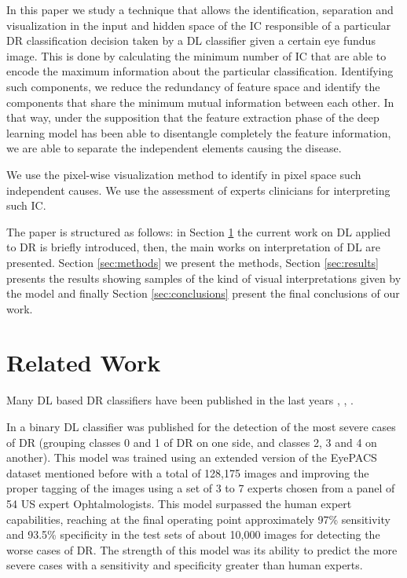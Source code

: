 \documentclass[preprint]{elsarticle}
\theoremstyle{definition} %
\theoremstyle{remark}
\begin{document}
In this paper we study a technique that allows the identification, separation and visualization in the input and hidden space of the IC responsible of a particular DR classification decision taken by a DL classifier given a certain eye fundus image. This is done by calculating the minimum number of IC that are able to encode the maximum information about the particular classification. Identifying such components, we reduce the redundancy of feature space and identify the components that share the minimum mutual information between each other. In that way, under the supposition that the feature extraction phase of the deep learning model has been able to disentangle completely the feature information, we are able to separate the independent elements causing the disease.

We use the pixel-wise visualization method to identify in pixel space such independent causes. We use the assessment of experts clinicians for interpreting such IC.

The paper is structured as follows: in Section \ref{sec:related} the current work on DL applied to DR is briefly introduced, then, the main works on interpretation of DL are presented. Section \ref{sec:methods} we present the methods, Section \ref{sec:results} presents the results showing samples of the kind of visual interpretations given by the model and finally Section \ref{sec:conclusions} present the final conclusions of our work.

\section{Related Work}\label{sec:related}

Many DL based DR classifiers have been published in the last years \citep{pratt2016convolutional}, \citep{DELATORRE2017}, \citep{doi:10.1001/jama.2016.17216}. 

In \citep{doi:10.1001/jama.2016.17216} a binary DL classifier was published for the detection of the most severe cases of DR (grouping classes 0 and 1 of DR on one side, and classes 2, 3 and 4 on another). This model was trained using an extended version of the EyePACS dataset mentioned before with a total of 128,175 images and improving the proper tagging of the images using a set of 3 to 7 experts chosen from a panel of 54 US expert Ophtalmologists. This model surpassed the human expert capabilities, reaching at the final operating point approximately  97\% sensitivity and 93.5\% specificity in the test sets of about 10,000 images for detecting the worse cases of DR. The strength of this model was its ability to predict the more severe cases with a sensitivity and specificity greater than human experts. 
\end{document}
